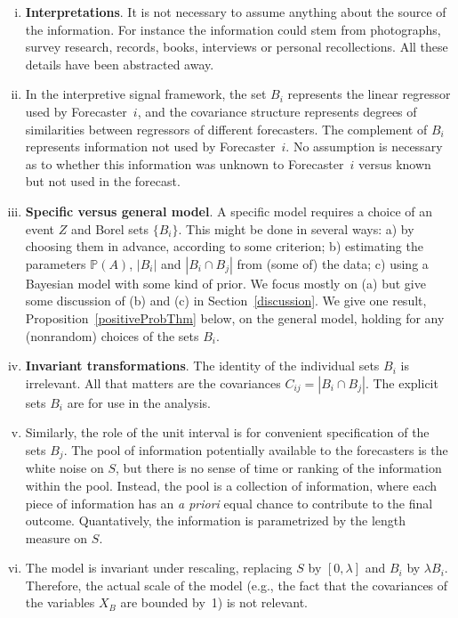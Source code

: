 \documentclass[11pt]{article}
\renewcommand{\P}{\mathbb{P}}
\theoremstyle{definition}
\theoremstyle{definition}
\def\P{{\mathbb P}}
\begin{document}
\begin{enumerate}[(i)]
\item {\bf Interpretations}. It is not necessary to assume anything 
about the source of the information.  For instance the information 
could stem from photographs, survey research, records, books, 
interviews or personal recollections.  All these details have 
been abstracted away.
\item In the interpretive signal framework, the set $B_i$ represents 
the linear regressor used by Forecaster~$i$, and the covariance 
structure represents degrees of similarities between regressors 
of different forecasters.  The complement of $B_i$ represents 
information not used by Forecaster~$i$.  No assumption is necessary
as to whether this information was unknown to Forecaster~$i$ versus
known but not used in the forecast.
\item {\bf Specific versus general model}. A specific model 
requires a choice of an event $Z$ and Borel sets $\{ B_i \}$.  
This might be done in several ways:
a) by choosing them in advance, according to some criterion;
b) estimating the parameters $\P(A)$, $|B_i|$ and $|B_i \cap B_j|$
from (some of) the data; c) using a Bayesian model with some kind of prior.  
We focus mostly on (a) but give some discussion of (b) and (c) in 
Section~\ref{discussion}.  We give one result, 
Proposition~\ref{positiveProbThm} below, on the general model, 
holding for any (nonrandom) choices of the sets $B_i$.
\label{item:specific}
\item {\bf Invariant transformations}.  The identity of the individual 
sets $B_i$ is irrelevant.  All that matters are the covariances $C_{ij} 
= |B_i \cap B_j|$.  The explicit sets $B_i$ are for use in the
analysis.
\item Similarly, the role of the unit interval is for convenient 
specification of the sets $B_j$.  The pool of information potentially
available to the forecasters is the white noise on $S$, but there is
no sense of time or ranking of the information within the pool. Instead,
the pool is a collection of information, where each piece of information
has an {\em a priori} equal chance to contribute to the final outcome.
Quantatively, the information is parametrized by the length measure on $S$.
\item The model is invariant under rescaling, replacing $S$
by $[0,\lambda]$ and $B_i$ by $\lambda B_i$.  Therefore, the
actual scale of the model (e.g., the fact that the covariances of 
the variables $X_B$ are bounded by~1) is not relevant. 

\end{enumerate}
\end{document}
